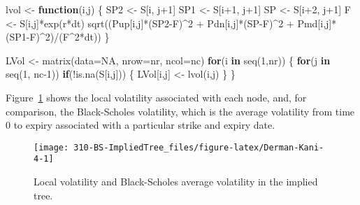 \documentclass[]{tufte-book}
\newenvironment{Shaded}{}{}
\newcommand{\AttributeTok}[1]{\textcolor[rgb]{0.49,0.56,0.16}{#1}}
\newcommand{\ConstantTok}[1]{\textcolor[rgb]{0.53,0.00,0.00}{#1}}
\newcommand{\ControlFlowTok}[1]{\textcolor[rgb]{0.00,0.44,0.13}{\textbf{#1}}}
\newcommand{\DecValTok}[1]{\textcolor[rgb]{0.25,0.63,0.44}{#1}}
\newcommand{\FunctionTok}[1]{\textcolor[rgb]{0.02,0.16,0.49}{#1}}
\newcommand{\NormalTok}[1]{#1}
\newcommand{\OtherTok}[1]{\textcolor[rgb]{0.00,0.44,0.13}{#1}}
\newcommand{\SpecialCharTok}[1]{\textcolor[rgb]{0.25,0.44,0.63}{#1}}
\begin{document}
\begin{Shaded}
\begin{Highlighting}[]
\NormalTok{  lvol }\OtherTok{\textless{}{-}} \ControlFlowTok{function}\NormalTok{(i,j) \{}
\NormalTok{    SP2 }\OtherTok{\textless{}{-}}\NormalTok{ S[i, j}\SpecialCharTok{+}\DecValTok{1}\NormalTok{]}
\NormalTok{    SP1 }\OtherTok{\textless{}{-}}\NormalTok{ S[i}\SpecialCharTok{+}\DecValTok{1}\NormalTok{, j}\SpecialCharTok{+}\DecValTok{1}\NormalTok{]}
\NormalTok{    SP }\OtherTok{\textless{}{-}}\NormalTok{ S[i}\SpecialCharTok{+}\DecValTok{2}\NormalTok{, j}\SpecialCharTok{+}\DecValTok{1}\NormalTok{]}
\NormalTok{    F }\OtherTok{\textless{}{-}}\NormalTok{ S[i,j]}\SpecialCharTok{*}\FunctionTok{exp}\NormalTok{(r}\SpecialCharTok{*}\NormalTok{dt)}
    \FunctionTok{sqrt}\NormalTok{((Pup[i,j]}\SpecialCharTok{*}\NormalTok{(SP2}\SpecialCharTok{{-}}\NormalTok{F)}\SpecialCharTok{\^{}}\DecValTok{2} \SpecialCharTok{+}\NormalTok{ Pdn[i,j]}\SpecialCharTok{*}\NormalTok{(SP}\SpecialCharTok{{-}}\NormalTok{F)}\SpecialCharTok{\^{}}\DecValTok{2} \SpecialCharTok{+}\NormalTok{ Pmd[i,j]}\SpecialCharTok{*}\NormalTok{(SP1}\SpecialCharTok{{-}}\NormalTok{F)}\SpecialCharTok{\^{}}\DecValTok{2}\NormalTok{)}\SpecialCharTok{/}\NormalTok{(F}\SpecialCharTok{\^{}}\DecValTok{2}\SpecialCharTok{*}\NormalTok{dt))}
\NormalTok{  \}}

\NormalTok{  LVol }\OtherTok{\textless{}{-}} \FunctionTok{matrix}\NormalTok{(}\AttributeTok{data=}\ConstantTok{NA}\NormalTok{, }\AttributeTok{nrow=}\NormalTok{nr, }\AttributeTok{ncol=}\NormalTok{nc)}
  \ControlFlowTok{for}\NormalTok{(i }\ControlFlowTok{in} \FunctionTok{seq}\NormalTok{(}\DecValTok{1}\NormalTok{,nr)) \{}
    \ControlFlowTok{for}\NormalTok{(j }\ControlFlowTok{in} \FunctionTok{seq}\NormalTok{(}\DecValTok{1}\NormalTok{, nc}\DecValTok{{-}1}\NormalTok{))}
      \ControlFlowTok{if}\NormalTok{(}\SpecialCharTok{!}\FunctionTok{is.na}\NormalTok{(S[i,j])) \{}
\NormalTok{        LVol[i,j] }\OtherTok{\textless{}{-}} \FunctionTok{lvol}\NormalTok{(i,j)}
\NormalTok{      \}}
\NormalTok{  \}}
\end{Highlighting}
\end{Shaded}

Figure~\ref{fig:Derman-Kani-4} shows the local volatility associated with
each node, and, for comparison, the Black-Scholes volatility, which is
the average volatility from time \(0\) to expiry associated with a
particular strike and expiry date.

\begin{figure}
\texttt{[image: 310-BS-ImpliedTree\_files/figure-latex/Derman-Kani-4-1]} \caption[Local volatility and Black-Scholes average volatility in the implied tree]{Local volatility and Black-Scholes average volatility in the implied tree.}\label{fig:Derman-Kani-4}
\end{figure}


\printindex
\end{document}
